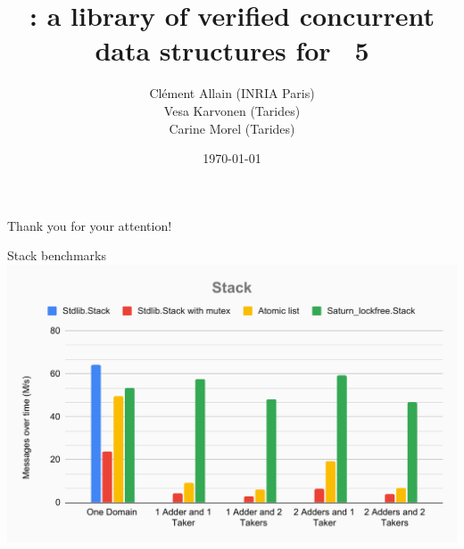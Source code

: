 \documentclass[xcolor=x11names]{beamer}
\title{\Saturn: a library of verified concurrent data structures for \OCaml~5}
\date{\today}
\author{
  Clément Allain (INRIA Paris) \\
  Vesa Karvonen (Tarides) \\
  Carine Morel (Tarides)
}
\begin{document}
\maketitle

% 





\begin{frame}
\LARGE
\centering
Thank you for your attention!
\end{frame}

\appendix


\begin{frame}{Stack benchmarks}
  \centering
      \includegraphics[width=0.8\linewidth]{images/Stack.pdf}
    \end{frame}
  
\end{document}
